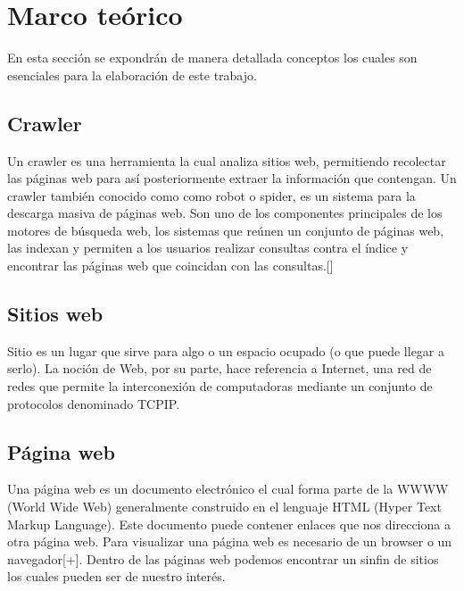 \chapter{Marco teórico}

En esta sección se expondrán de manera detallada conceptos los cuales son esenciales para la elaboración de este trabajo.



\section{Crawler}

Un crawler es una herramienta la cual analiza sitios web, permitiendo recolectar las páginas web para así posteriormente extraer la información que contengan. Un crawler también conocido como como robot o spider, es un sistema para la descarga masiva de páginas web. Son uno de los componentes principales de los motores de búsqueda web, los sistemas que reúnen un conjunto de páginas web, las indexan y permiten a los usuarios realizar consultas contra el índice y encontrar las páginas web que coincidan con las consultas.[\*]


\section{Sitios web}

Sitio es un lugar que sirve para algo o un espacio ocupado (o que puede llegar a serlo). La noción de Web, por su parte, hace referencia a Internet, una red de redes que permite la interconexión de computadoras mediante un conjunto de protocolos denominado TCP\/IP.

\section{Página web}

Una página web es un documento electrónico el cual forma parte de la WWWW (World Wide Web) generalmente construido en el lenguaje HTML (Hyper Text Markup Language). Este documento puede contener enlaces que nos direcciona a otra página web. Para visualizar una página web es necesario de un browser o un navegador[+]. Dentro de las páginas web podemos encontrar un sinfin de sitios los cuales pueden ser de nuestro interés.

